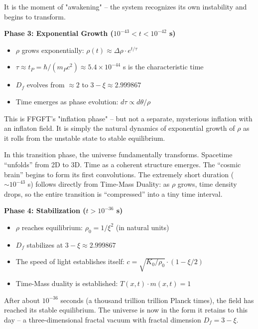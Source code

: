 	It is the moment of "awakening" -- the system recognizes its own instability and begins to transform.
	
	\textbf{Phase 3: Exponential Growth ($10^{-43} < t < 10^{-42}$ s)}
	
	\begin{itemize}[leftmargin=*]
		\item $\rho$ grows exponentially: $\rho(t) \approx \Delta\rho \cdot e^{t/\tau}$
		\item $\tau \approx t_P = \hbar/(m_P c^2) \approx 5.4 \times 10^{-44}$ s is the characteristic time
		\item $D_f$ evolves from $\approx 2$ to $3-\xi \approx 2.999867$
		\item Time emerges as phase evolution: $d\tau \propto d\theta/\rho$
	\end{itemize}
	
	This is FFGFT's "inflation phase" -- but not a separate, mysterious inflation with an inflaton field. It is simply the natural dynamics of exponential growth of $\rho$ as it rolls from the unstable state to stable equilibrium.
	
	In this transition phase, the universe fundamentally transforms. Spacetime ``unfolds'' from 2D to 3D. Time as a coherent structure emerges. The ``cosmic brain'' begins to form its first convolutions. The extremely short duration ($\sim 10^{-43}$ s) follows directly from Time-Mass Duality: as $\rho$ grows, time density drops, so the entire transition is ``compressed'' into a tiny time interval.
	
	\textbf{Phase 4: Stabilization ($t > 10^{-36}$ s)}
	
	\begin{itemize}[leftmargin=*]
		\item $\rho$ reaches equilibrium: $\rho_0 = 1/\xi^2$ (in natural units)
		\item $D_f$ stabilizes at $3 - \xi \approx 2.999867$
		\item The speed of light establishes itself: $c = \sqrt{K_0/\rho_0} \cdot (1 - \xi/2)$
		\item Time-Mass duality is established: $T(x,t) \cdot m(x,t) = 1$
	\end{itemize}
	
	After about $10^{-36}$ seconds (a thousand trillion trillion Planck times), the field has reached its stable equilibrium. The universe is now in the form it retains to this day -- a three-dimensional fractal vacuum with fractal dimension $D_f = 3 - \xi$.
	
